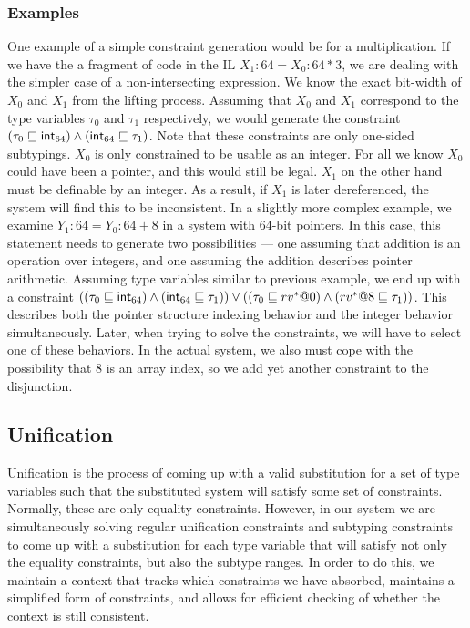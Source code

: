 \subsubsection{Examples}
One example of a simple constraint generation would be for a multiplication. If we have the a fragment of code in the IL $X_1:64 = X_0:64 * 3$, we are dealing with the simpler case of a non-intersecting expression. We know the exact bit-width of $X_0$ and $X_1$ from the lifting process. Assuming that $X_0$ and $X_1$ correspond to the type variables $\tau_0$ and $\tau_1$ respectively, we would generate the constraint $(\tau_0 \sqsubseteq \mathsf{int}_{64}) \wedge (\mathsf{int}_{64} \sqsubseteq \tau_1)$. Note that these constraints are only one-sided subtypings. $X_0$ is only constrained to be usable as an integer. For all we know $X_0$ could have been a pointer, and this would still be legal. $X_1$ on the other hand must be definable by an integer. As a result, if $X_1$ is later dereferenced, the system will find this to be inconsistent. In a slightly more complex example, we examine $Y_1:64 = Y_0:64 + 8$ in a system with 64-bit pointers. In this case, this statement needs to generate two possibilities --- one assuming that addition is an operation over integers, and one assuming the addition describes pointer arithmetic. Assuming type variables similar to previous example, we end up with a constraint $((\tau_0 \sqsubseteq \mathsf{int}_{64}) \wedge (\mathsf{int}_{64} \sqsubseteq \tau_1)) \vee ((\tau_0 \sqsubseteq rv^*@0) \wedge (rv^*@8 \sqsubseteq \tau_1))$. This describes both the pointer structure indexing behavior and the integer behavior simultaneously. Later, when trying to solve the constraints, we will have to select one of these behaviors. In the actual system, we also must cope with the possibility that $8$ is an array index, so we add yet another constraint to the disjunction.

\subsection{Unification}
Unification is the process of coming up with a valid substitution for a set of type variables such that the substituted system will satisfy some set of constraints. Normally, these are only equality constraints. However, in our system we are simultaneously solving regular unification constraints and subtyping constraints to come up with a substitution for each type variable that will satisfy not only the equality constraints, but also the subtype ranges. In order to do this, we maintain a context that tracks which constraints we have absorbed, maintains a simplified form of constraints, and allows for efficient checking of whether the context is still consistent.

